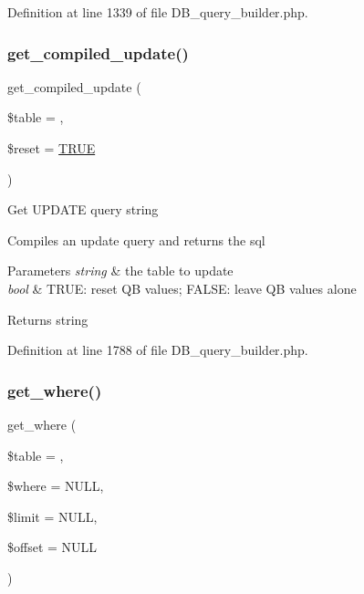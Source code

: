 Definition at line 1339 of file D\+B\+\_\+query\+\_\+builder.\+php.

\mbox{\label{class_c_i___d_b__query__builder_a77fb150224714405067df7c300c317b0}} 
\subsubsection{\texorpdfstring{get\_compiled\_update()}{get\_compiled\_update()}}
{\footnotesize\ttfamily get\+\_\+compiled\+\_\+update (\begin{DoxyParamCaption}\item[{}]{\$table = {\ttfamily \textquotesingle{}\textquotesingle{}},  }\item[{}]{\$reset = {\ttfamily \mbox{\hyperlink{constants_8php_ae04a3efe6aa42044f803ee90c2277846}{T\+R\+UE}}} }\end{DoxyParamCaption})}

Get U\+P\+D\+A\+TE query string

Compiles an update query and returns the sql


\begin{DoxyParams}{Parameters}
{\em string} & the table to update \\
\hline
{\em bool} & T\+R\+UE\+: reset QB values; F\+A\+L\+SE\+: leave QB values alone \\
\hline
\end{DoxyParams}
\begin{DoxyReturn}{Returns}
string 
\end{DoxyReturn}


Definition at line 1788 of file D\+B\+\_\+query\+\_\+builder.\+php.

\mbox{\label{class_c_i___d_b__query__builder_a8cae750fdc32b3c91544c091673fd17b}} 
\subsubsection{\texorpdfstring{get\_where()}{get\_where()}}
{\footnotesize\ttfamily get\+\_\+where (\begin{DoxyParamCaption}\item[{}]{\$table = {\ttfamily \textquotesingle{}\textquotesingle{}},  }\item[{}]{\$where = {\ttfamily NULL},  }\item[{}]{\$limit = {\ttfamily NULL},  }\item[{}]{\$offset = {\ttfamily NULL} }\end{DoxyParamCaption})}

